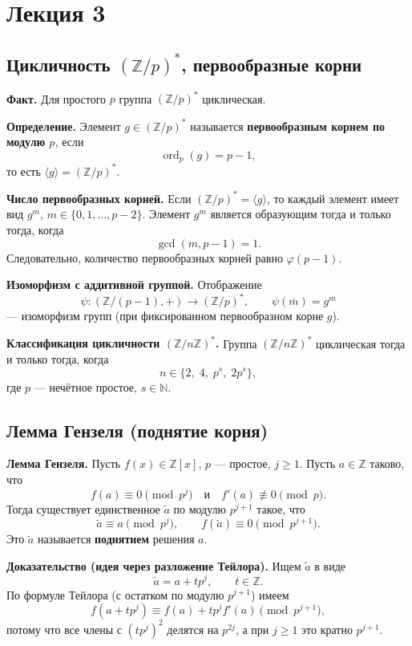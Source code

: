 \documentclass[12pt,a4paper]{article}
\newcommand{\Z}{\mathbb{Z}}
\DeclareMathOperator{\gcdop}{gcd}
\DeclareMathOperator{\ord}{ord}
\begin{document}
\section*{\centering Лекция 3}

\subsection*{Цикличность $(\Z/p)^{\ast}$, первообразные корни}

\textbf{Факт.} Для простого $p$ группа $(\Z/p)^{\ast}$ циклическая.

\textbf{Определение.} Элемент $g\in(\Z/p)^{\ast}$ называется \textbf{первообразным корнем по модулю $p$}, если
\[
\ord_p(g)=p-1,
\]
то есть $\langle g\rangle=(\Z/p)^{\ast}$.

\textbf{Число первообразных корней.}
Если $(\Z/p)^{\ast}=\langle g\rangle$, то каждый элемент имеет вид $g^m$, $m\in\{0,1,\dots,p-2\}$.
Элемент $g^m$ является образующим тогда и только тогда, когда
\[
\gcdop(m,p-1)=1.
\]
Следовательно, количество первообразных корней равно $\varphi(p-1)$.

\textbf{Изоморфизм с аддитивной группой.}
Отображение
\[
\psi:(\Z/(p-1),+)\to(\Z/p)^{\ast},\qquad \psi(\overline{m})=g^m
\]
— изоморфизм групп (при фиксированном первообразном корне $g$).

\medskip
\textbf{Классификация цикличности $(\Z/n\Z)^{\ast}$.}
Группа $(\Z/n\Z)^{\ast}$ циклическая тогда и только тогда, когда
\[
n\in\{2,\;4,\;p^s,\;2p^s\},
\]
где $p$ — нечётное простое, $s\in\mathbb{N}$.

\subsection*{Лемма Гензеля (поднятие корня)}

\textbf{Лемма Гензеля.}
Пусть $f(x)\in\Z[x]$, $p$ — простое, $j\ge 1$.
Пусть $a\in\Z$ таково, что
\[
f(a)\equiv 0\pmod{p^j}
\quad\text{и}\quad
f'(a)\not\equiv 0\pmod p.
\]
Тогда существует единственное $\tilde a$ по модулю $p^{j+1}$ такое, что
\[
\tilde a\equiv a\pmod{p^j},
\qquad
f(\tilde a)\equiv 0\pmod{p^{j+1}}.
\]
Это $\tilde a$ называется \textbf{поднятием} решения $a$.

\textbf{Доказательство (идея через разложение Тейлора).}
Ищем $\tilde a$ в виде
\[
\tilde a=a+t p^j,\qquad t\in\Z.
\]
По формуле Тейлора (с остатком по модулю $p^{j+1}$) имеем
\[
f(a+t p^j)\equiv f(a)+t p^j f'(a)\pmod{p^{j+1}},
\]
потому что все члены с $(t p^j)^2$ делятся на $p^{2j}$, а при $j\ge 1$ это кратно $p^{j+1}$.
\end{document}
